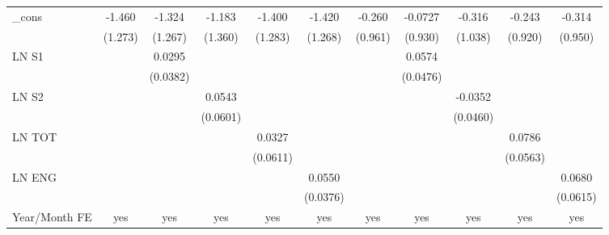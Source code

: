 \begin{table}[htbp]
\begin{tabular}{l*{10}{c}}
\_cons          &   -1.460         &   -1.324         &   -1.183         &   -1.400         &   -1.420         &   -0.260         &  -0.0727         &   -0.316         &   -0.243         &   -0.314         \\
                &  (1.273)         &  (1.267)         &  (1.360)         &  (1.283)         &  (1.268)         &  (0.961)         &  (0.930)         &  (1.038)         &  (0.920)         &  (0.950)         \\
LN S1           &                  &   0.0295         &                  &                  &                  &                  &   0.0574         &                  &                  &                  \\
                &                  & (0.0382)         &                  &                  &                  &                  & (0.0476)         &                  &                  &                  \\
LN S2           &                  &                  &   0.0543         &                  &                  &                  &                  &  -0.0352         &                  &                  \\
                &                  &                  & (0.0601)         &                  &                  &                  &                  & (0.0460)         &                  &                  \\
LN TOT          &                  &                  &                  &   0.0327         &                  &                  &                  &                  &   0.0786         &                  \\
                &                  &                  &                  & (0.0611)         &                  &                  &                  &                  & (0.0563)         &                  \\
LN ENG          &                  &                  &                  &                  &   0.0550         &                  &                  &                  &                  &   0.0680         \\
                &                  &                  &                  &                  & (0.0376)         &                  &                  &                  &                  & (0.0615)         \\
\hline
Year/Month FE   &      yes         &      yes         &      yes         &      yes         &      yes         &      yes         &      yes         &      yes         &      yes         &      yes         \\

\end{tabular}
\end{table}
